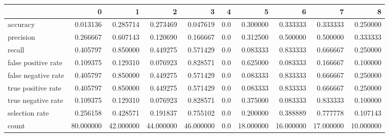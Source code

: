 \begin{tabular}{lrrrrrrrrr}
\toprule
{} &          0 &          1 &          2 &          3 &    4 &          5 &          6 &          7 &          8 \\
\midrule
accuracy            &   0.013136 &   0.285714 &   0.273469 &   0.047619 &  0.0 &   0.300000 &   0.333333 &   0.333333 &   0.250000 \\
precision           &   0.266667 &   0.607143 &   0.120690 &   0.166667 &  0.0 &   0.312500 &   0.500000 &   0.500000 &   0.333333 \\
recall              &   0.405797 &   0.850000 &   0.449275 &   0.571429 &  0.0 &   0.083333 &   0.833333 &   0.666667 &   0.250000 \\
false positive rate &   0.109375 &   0.129310 &   0.076923 &   0.828571 &  0.0 &   0.625000 &   0.083333 &   0.166667 &   0.100000 \\
false negative rate &   0.405797 &   0.850000 &   0.449275 &   0.571429 &  0.0 &   0.083333 &   0.833333 &   0.666667 &   0.250000 \\
true positive rate  &   0.405797 &   0.850000 &   0.449275 &   0.571429 &  0.0 &   0.083333 &   0.833333 &   0.666667 &   0.250000 \\
true negative rate  &   0.109375 &   0.129310 &   0.076923 &   0.828571 &  0.0 &   0.375000 &   0.083333 &   0.833333 &   0.100000 \\
selection rate      &   0.256158 &   0.428571 &   0.191837 &   0.755102 &  0.0 &   0.200000 &   0.388889 &   0.777778 &   0.107143 \\
count               &  80.000000 &  42.000000 &  44.000000 &  46.000000 &  0.0 &  18.000000 &  16.000000 &  17.000000 &  10.000000 \\
\bottomrule
\end{tabular}
